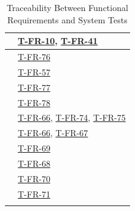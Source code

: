 \documentclass[12pt, titlepage]{article}
\providecommand{\descriptiveid}[1]{\texttt{\detokenize{#1}}}
\providecommand{\rref}[1]{\descriptiveid{#1}}
\begin{document}
\begin{longtable}{p{} p{}}
    \rref{FR_ExternalSupervisorScope} & \hyperref[T-FR-10]{T-FR-10}, \hyperref[T-FR-41]{T-FR-41} \\ \hline
    \rref{FR_LogExternalErrors} & \hyperref[T-FR-76]{T-FR-76} \\ \hline
    \rref{FR_RejectComponentDisable} & \hyperref[T-FR-57]{T-FR-57} \\ \hline
    \rref{FR_DisplayTimestamps} & \hyperref[T-FR-77]{T-FR-77} \\ \hline
    \rref{FR_DurableNotifications} & \hyperref[T-FR-78]{T-FR-78} \\ \hline
    \rref{FR_ReverifyUsers} & \hyperref[T-FR-66]{T-FR-66}, \hyperref[T-FR-74]{T-FR-74}, \hyperref[T-FR-75]{T-FR-75} \\ \hline
    \rref{FR_ImportEnrollment} & \hyperref[T-FR-66]{T-FR-66}, \hyperref[T-FR-67]{T-FR-67} \\ \hline
    \rref{FR_UpdateEnrollment} & \hyperref[T-FR-69]{T-FR-69} \\ \hline
    \rref{FR_EnrollmentDiscrepency} & \hyperref[T-FR-68]{T-FR-68} \\ \hline
    \rref{FR_NeedsGroup} & \hyperref[T-FR-70]{T-FR-70} \\ \hline
    \rref{FR_AssignTA} & \hyperref[T-FR-71]{T-FR-71} \\ \hline

    \bottomrule

    \caption{Traceability Between Functional Requirements and System Tests}
    \label{tab:FR2Test}
  \end{longtable}
\end{document}
